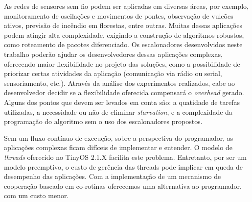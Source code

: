 As redes de sensores sem fio podem ser aplicadas em diversas áreas, por exemplo, monitoramento de oscilações 
e movimentos de pontes, observação de vulcões ativos, previsão de incêndio em florestas, entre outras. 
Muitas dessas aplicações podem atingir alta complexidade, exigindo a construção de algoritmos robustos, 
como roteamento de pacotes diferenciado.
Os escalonadores desenvolvidos neste trabalho poderão ajudar os desenvolvedores dessas aplicações complexas,
oferecendo maior flexibilidade no projeto das soluções, como 
a possibilidade de priorizar certas atividades da aplicação (comunicação via rádio ou serial, sensoriamento, etc.).
Através da análise dos experimentos realizados, cabe ao desenvolvedor decidir se a flexibilidade oferecida compensará o
\textit{overhead} gerado. Alguns dos pontos que devem ser levados em conta são: a quatidade de tarefas utilizadas, a
necessidade ou não de eliminar \textit{starvation}, e a complexidade da programação do algoritmo sem o uso dos
escalonadores propostos.

Sem um fluxo contínuo de execução, sobre a perspectiva do programador, as aplicações complexas ficam difíceis de
implementar e entender. O modelo de \textit{threads} oferecido no 
TinyOS 2.1.X\cite{TEP134} facilita este problema. Entretanto, por ser um modelo preemptivo, o custo de
gerência das threads pode implicar em queda de desempenho das aplicações. 
Com a implementação de um mecanismo de cooperação baseado em co-rotinas oferecemos uma alternativa ao programador, com
um custo menor.



